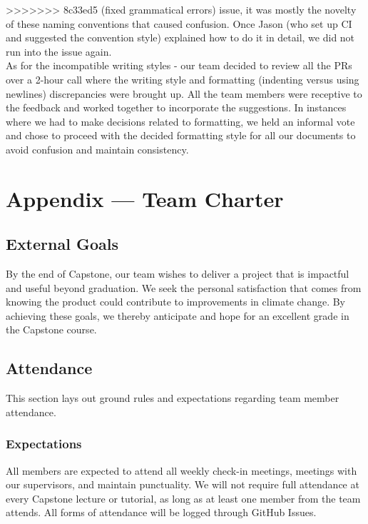 \documentclass{article}
\begin{document}
\begin{enumerate}
>>>>>>> 8c33ed5 (fixed grammatical errors)
    issue, it was mostly the novelty of these naming conventions that caused confusion. Once Jason (who set up CI and
    suggested the convention style) explained how to do it in detail, we did not run into the issue again.\\
    \newline
    As for the incompatible writing styles -  our team decided to review all the PRs over a 2-hour call where the writing
    style and formatting (indenting versus using newlines) discrepancies were brought up. All the team members were
    receptive to the feedback and worked together to incorporate the suggestions. In instances where we had to make
    decisions related to formatting, we held an informal vote and chose to proceed with the decided formatting style
    for all our documents to avoid confusion and maintain consistency.
\end{enumerate}

\newpage{}

\section*{Appendix --- Team Charter \cite{ref1}}

\subsection*{External Goals}

By the end of Capstone, our team wishes to deliver a project that is impactful
and useful beyond graduation. We seek the personal satisfaction that comes from
knowing the product could contribute to improvements in climate change. By
achieving these goals, we thereby anticipate and hope for an excellent grade in
the Capstone course.

\subsection*{Attendance}

This section lays out ground rules and expectations regarding team member
attendance.

\subsubsection*{Expectations}

All members are expected to attend all weekly check-in meetings, meetings with
our supervisors, and maintain punctuality. We will not require full attendance
at every Capstone lecture or tutorial, as long as at least one member from the
team attends. All forms of attendance will be logged through GitHub Issues.
\end{document}
